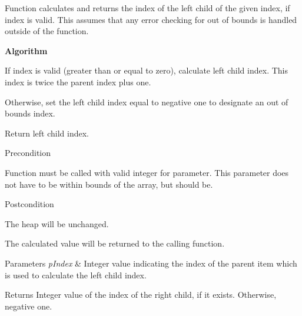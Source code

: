 \-Function calculates and returns the index of the left child of the given index, if index is valid. \-This assumes that any error checking for out of bounds is handled outside of the function.

{\bfseries \-Algorithm} 
\begin{DoxyEnumerate}
\item \-If index is valid (greater than or equal to zero), calculate left child index. \-This index is twice the parent index plus one.
\item \-Otherwise, set the left child index equal to negative one to designate an out of bounds index.
\item \-Return left child index.
\end{DoxyEnumerate}

\begin{DoxyPrecond}{\-Precondition}

\begin{DoxyEnumerate}
\item \-Function must be called with valid integer for parameter. \-This parameter does not have to be within bounds of the array, but should be.
\end{DoxyEnumerate}
\end{DoxyPrecond}
\begin{DoxyPostcond}{\-Postcondition}

\begin{DoxyEnumerate}
\item \-The heap will be unchanged.
\item \-The calculated value will be returned to the calling function.
\end{DoxyEnumerate}
\end{DoxyPostcond}

\begin{DoxyParams}{\-Parameters}
{\em p\-Index} & \-Integer value indicating the index of the parent item which is used to calculate the left child index.\\
\hline
\end{DoxyParams}
\begin{DoxyReturn}{\-Returns}
\-Integer value of the index of the right child, if it exists. \-Otherwise, negative one.
\end{DoxyReturn}

